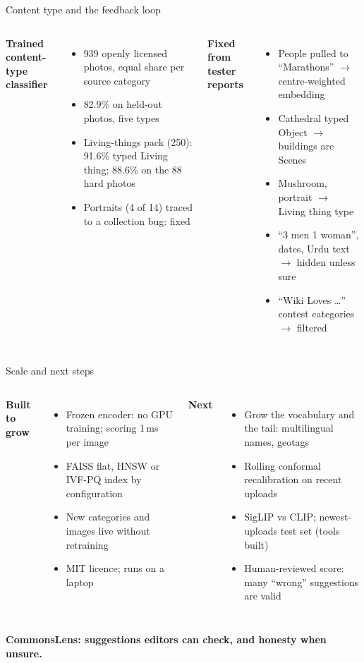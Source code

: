 \documentclass[aspectratio=169,11pt]{beamer}
\begin{document}
\begin{frame}{Content type and the feedback loop}
\begin{columns}[T]
\textbf{Trained content-type classifier}
\begin{itemize}\small\setlength{\itemsep}{3pt}
\item 939 openly licensed photos, equal share per source category
\item 82.9\% on held-out photos, five types
\item Living-things pack (250): 91.6\% typed Living thing; 88.6\% on the 88 hard photos
\item Portraits (4 of 14) traced to a collection bug: fixed
\end{itemize}
\textbf{Fixed from tester reports}
\begin{itemize}\small\setlength{\itemsep}{3pt}
\item People pulled to ``Marathons'' $\rightarrow$ centre-weighted embedding
\item Cathedral typed Object $\rightarrow$ buildings are Scenes
\item Mushroom, portrait $\rightarrow$ Living thing type
\item ``3 men 1 woman'', dates, Urdu text $\rightarrow$ hidden unless sure
\item ``Wiki Loves \dots'' contest categories $\rightarrow$ filtered
\end{itemize}
\end{columns}
\end{frame}

\begin{frame}{Scale and next steps}
\begin{columns}[T]
\textbf{Built to grow}
\begin{itemize}\small\setlength{\itemsep}{3pt}
\item Frozen encoder: no GPU training; scoring 1\,ms per image
\item FAISS flat, HNSW or IVF-PQ index by configuration
\item New categories and images live without retraining
\item MIT licence; runs on a laptop
\end{itemize}
\textbf{Next}
\begin{itemize}\small\setlength{\itemsep}{3pt}
\item Grow the vocabulary and the tail: multilingual names, geotags
\item Rolling conformal recalibration on recent uploads
\item SigLIP vs CLIP; newest-uploads test set (tools built)
\item Human-reviewed score: many ``wrong'' suggestions are valid
\end{itemize}
\end{columns}
\vspace{16pt}
\centering\large\color{accent}\textbf{CommonsLens: suggestions editors can check, and honesty when unsure.}
\end{frame}
\end{document}
